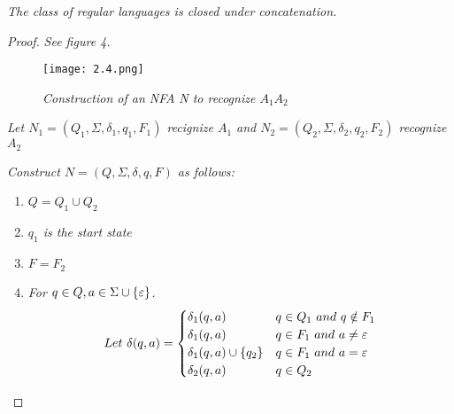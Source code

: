 \documentclass{article}
\begin{document}
\setcounter{defn}{10}
\begin{thm}
    \textit{The class of regular languages is closed under concatenation.}
    \begin{proof}
        \textit{See figure 4.}
        \begin{figure}[b]
            \centering
            \texttt{[image: 2.4.png]}
            \caption{\textit{Construction of an NFA N to recognize $A_1A_2$}}
        \end{figure}
        \textit{Let $N_1 = (Q_1,\Sigma,\delta_1,q_1,F_1)$ recignize $A_1$ and $N_2 = (Q_2,\Sigma,\delta_2,q_2,F_2)$ recognize $A_2$}

        \textit{Construct $N = (Q,\Sigma,\delta,q,F)$ as follows:}

        \begin{enumerate}
            \item $Q = Q_1\cup Q_2$
            \item \textit{$q_1$ is the start state}
            \item $F = F_2$
            \item \textit{For $q\in Q,a\in \Sigma\cup\{\varepsilon\}$.}
            \[ 
                Let ~ \delta(q,a) = 
                \begin{cases}
                    \delta_1(q,a) & q\in Q_1~and~q\notin F_1 \\
                    \delta_1(q,a) & q\in F_1~and~a\neq\varepsilon \\
                    \delta_1(q,a)\cup\{q_2\} & q\in F_1~and~a=\varepsilon \\
                    \delta_2(q,a) & q\in Q_2 \\
                \end{cases}
            \]
        \end{enumerate}
    \end{proof}
\end{thm}
\end{document}
